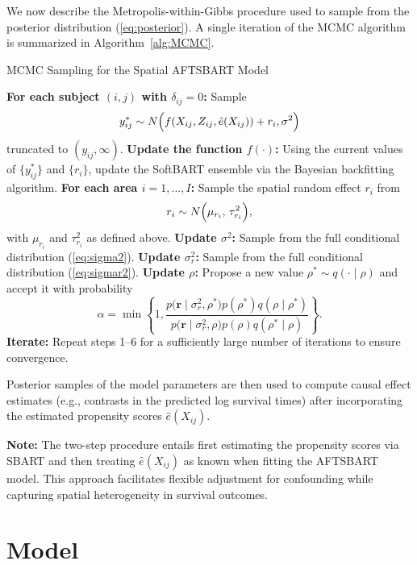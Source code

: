 \documentclass[useAMS,referee]{biom}
\begin{document}
We now describe the Metropolis-within-Gibbs procedure used to sample from the posterior distribution (\ref{eq:posterior}). A single iteration of the MCMC algorithm is summarized in Algorithm~\ref{alg:MCMC}.

\begin{algorithm}[H]
\caption{MCMC Sampling for the Spatial AFTSBART Model}\label{alg:MCMC}
\begin{algorithmic}[1]
\STATE \textbf{For each subject $(i,j)$ with $\delta_{ij}=0$:} Sample
\[
y_{ij}^\ast \sim N\Bigl(f(X_{ij},Z_{ij},\hat{e}(X_{ij}))+r_i,\sigma^2\Bigr)
\]
truncated to $(y_{ij},\infty)$.
\STATE \textbf{Update the function $f(\cdot)$:} Using the current values of $\{y_{ij}^\ast\}$ and $\{r_i\}$, update the SoftBART ensemble via the Bayesian backfitting algorithm.
\STATE \textbf{For each area $i=1,\ldots,I$:} Sample the spatial random effect $r_i$ from
\[
r_i\sim N\Bigl(\mu_{r_i},\,\tau_{r_i}^2\Bigr),
\]
with $\mu_{r_i}$ and $\tau_{r_i}^2$ as defined above.
\STATE \textbf{Update $\sigma^2$:} Sample from the full conditional distribution (\ref{eq:sigma2}).
\STATE \textbf{Update $\sigma_r^2$:} Sample from the full conditional distribution (\ref{eq:sigmar2}).
\STATE \textbf{Update $\rho$:} Propose a new value $\rho^\ast\sim q(\cdot\mid\rho)$ and accept it with probability
\[
\alpha=\min\left\{1,\frac{p\bigl(\bm{r}\mid\sigma_r^2,\rho^\ast\bigr)p(\rho^\ast)q(\rho\mid\rho^\ast)}{p\bigl(\bm{r}\mid\sigma_r^2,\rho\bigr)p(\rho)q(\rho^\ast\mid\rho)}\right\}.
\]
\STATE \textbf{Iterate:} Repeat steps 1--6 for a sufficiently large number of iterations to ensure convergence.
\end{algorithmic}
\end{algorithm}

Posterior samples of the model parameters are then used to compute causal effect estimates (e.g., contrasts in the predicted log survival times) after incorporating the estimated propensity scores $\hat{e}(X_{ij})$.

\vspace{0.5em}
\noindent \textbf{Note:} The two-step procedure entails first estimating the propensity scores via SBART and then treating $\hat{e}(X_{ij})$ as known when fitting the AFTSBART model. This approach facilitates flexible adjustment for confounding while capturing spatial heterogeneity in survival outcomes.

\medskip



\section{Model}
\end{document}
